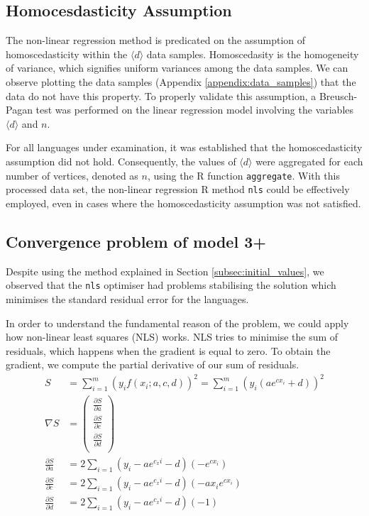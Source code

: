\subsection{Homocesdasticity Assumption}

The non-linear regression method is predicated on the assumption of homoscedasticity within the $\langle d \rangle$ data samples. Homoscedasity is the homogeneity of variance, which signifies uniform variances among the data samples. We can observe plotting the data samples (Appendix \ref{appendix:data_samples}) that the data do not have this property. To properly validate this assumption, a Breusch-Pagan test was performed on the linear regression model involving the variables $\langle d \rangle$ and $n$.

For all languages under examination, it was established that the homoscedasticity assumption did not hold. Consequently, the values of $\langle d \rangle$ were aggregated for each number of vertices, denoted as $n$, using the R function \verb|aggregate|. With this processed data set, the non-linear regression R method \verb|nls| could be effectively employed, even in cases where the homoscedasticity assumption was not satisfied.


\subsection{Convergence problem of model 3+}

Despite using the method explained in Section \ref{subsec:initial_values}, we observed that the \verb|nls| optimiser had problems stabilising the solution which minimises the standard residual error for the languages. 

In order to understand the fundamental reason of the problem, we could apply how non-linear least squares (NLS) works. NLS tries to minimise the sum of residuals, which happens when the gradient is equal to zero. To obtain the gradient, we compute the partial derivative of our sum of residuals.
\begin{align*}
    S &= \sum_{i=1}^m (y_i  f(x_i; a,c,d))^2  = \sum_{i=1}^m (y_i  (ae^{cx_i}+d))^2 \\
    \nabla S &= \begin{pmatrix}
        \frac{\partial S}{\partial a} \\
        \frac{\partial S}{\partial c} \\
        \frac{\partial S}{\partial d} \\
    \end{pmatrix} \\
    \frac{\partial S}{\partial a} &= 2 \sum_{i=1}(y_i-ae^{c_xi}-d)(-e^{cx_i})\\
    \frac{\partial S}{\partial c} &= 2 \sum_{i=1}(y_i-ae^{c_xi}-d)(-ax_ie^{cx_i})\\
    \frac{\partial S}{\partial d} &= 2 \sum_{i=1}(y_i-ae^{c_xi}-d)(-1)\\
\end{align*}

